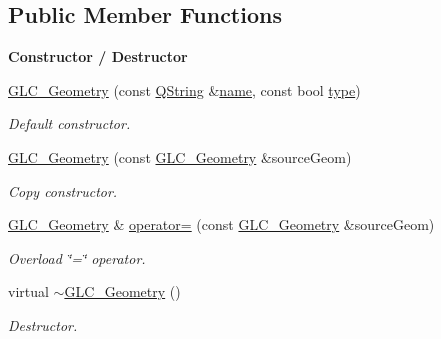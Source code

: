 \subsection*{Public Member Functions}
\begin{Indent}{\bf Constructor / Destructor}\par
\begin{DoxyCompactItemize}
\item 
\hyperlink{class_g_l_c___geometry_aba8f7d2b46669deb5725dca34983031a}{G\-L\-C\-\_\-\-Geometry} (const \hyperlink{group___u_a_v_objects_plugin_gab9d252f49c333c94a72f97ce3105a32d}{Q\-String} \&\hyperlink{glext_8h_ad977737dfc9a274a62741b9500c49a32}{name}, const bool \hyperlink{glext_8h_a7d05960f4f1c1b11f3177dc963a45d86}{type})
\begin{DoxyCompactList}\small\item\em Default constructor. \end{DoxyCompactList}\item 
\hyperlink{class_g_l_c___geometry_acf88f203fa1c4bb7017c64bfda88e463}{G\-L\-C\-\_\-\-Geometry} (const \hyperlink{class_g_l_c___geometry}{G\-L\-C\-\_\-\-Geometry} \&source\-Geom)
\begin{DoxyCompactList}\small\item\em Copy constructor. \end{DoxyCompactList}\item 
\hyperlink{class_g_l_c___geometry}{G\-L\-C\-\_\-\-Geometry} \& \hyperlink{class_g_l_c___geometry_a066e0ed3cee01cfb78878e815c814802}{operator=} (const \hyperlink{class_g_l_c___geometry}{G\-L\-C\-\_\-\-Geometry} \&source\-Geom)
\begin{DoxyCompactList}\small\item\em Overload \char`\"{}=\char`\"{} operator. \end{DoxyCompactList}\item 
virtual \hyperlink{class_g_l_c___geometry_ab3b491e9d08cb28ae5085e79d5e70ffb}{$\sim$\-G\-L\-C\-\_\-\-Geometry} ()
\begin{DoxyCompactList}\small\item\em Destructor. \end{DoxyCompactList}\end{DoxyCompactItemize}
\end{Indent}
